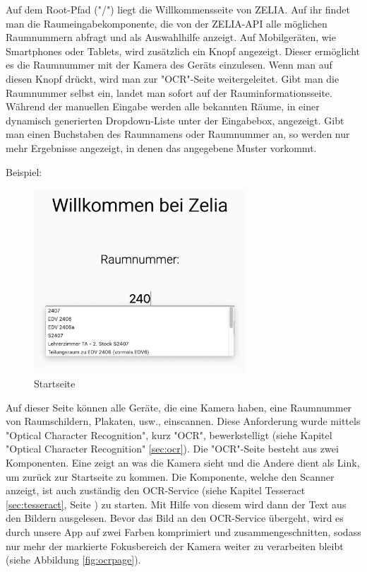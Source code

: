 \begin{minipage}{\textwidth}
    \label{sec:webcompstart}
    
    Auf dem Root-Pfad ("/") liegt die Willkommensseite von ZELIA. Auf ihr findet man die Raumeingabekomponente, die von der ZELIA-API alle möglichen Raumnummern abfragt und als Auswahlhilfe anzeigt. Auf Mobilgeräten, wie Smartphones oder Tablets, wird zusätzlich ein Knopf angezeigt. Dieser ermöglicht es die Raumnummer mit der Kamera des Geräts einzulesen. Wenn man auf diesen Knopf drückt, wird man zur "OCR"-Seite weitergeleitet. Gibt man die Raumnummer selbst ein, landet man sofort auf der Rauminformationsseite. Während der manuellen Eingabe werden alle bekannten Räume, in einer dynamisch generierten Dropdown-Liste unter der Eingabebox, angezeigt. Gibt man einen Buchstaben des Raumnamens oder Raumnummer an, so werden nur mehr Ergebnisse angezeigt, in denen das angegebene Muster vorkommt.
\end{minipage}

Beispiel:

\begin{figure}[H]
    \centering
    \includegraphics[width=80mm]{media/WebComponents/Startseite_light.png}
    \caption{Startseite}
    \label{fig:compinput}
\end{figure}



Auf dieser Seite können alle Geräte, die eine Kamera haben, eine Raumnummer von Raumschildern, Plakaten, usw., einscannen. Diese Anforderung wurde mittels "Optical Character Recognition", kurz "OCR", bewerkstelligt (siehe Kapitel "Optical Character Recognition" \ref{sec:ocr}). Die "OCR"-Seite besteht aus zwei Komponenten. Eine zeigt an was die Kamera sieht und die Andere dient als Link, um zurück zur Startseite zu kommen. Die Komponente, welche den Scanner anzeigt, ist auch zuständig den OCR-Service (siehe Kapitel Tesseract \ref{sec:tesseract}, Seite \pageref{sec:tesseract}) zu starten. Mit Hilfe von diesem wird dann der Text aus den Bildern ausgelesen. Bevor das Bild an den OCR-Service übergeht, wird es durch unsere App auf zwei Farben komprimiert und zusammengeschnitten, sodass nur mehr der markierte Fokusbereich der Kamera weiter zu verarbeiten bleibt (siehe Abbildung \ref{fig:ocrpage}).

